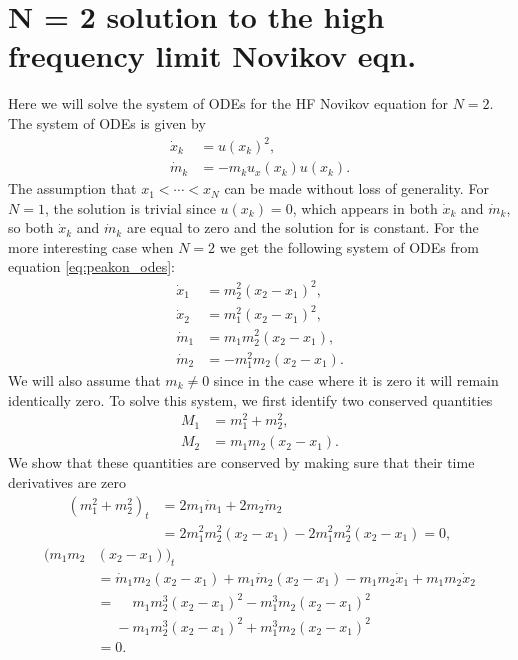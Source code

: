 \documentclass[english,master]{liumaiex}
\theoremstyle{plain}
\theoremstyle{definition}
\begin{document}
\section{N = 2 solution to the high frequency limit Novikov eqn.}
Here we will solve the system of ODEs for the HF Novikov equation for $N = 2$. The system of ODEs is given by
\begin{equation}
\begin{aligned}
	\dot{x}_k &= u(x_k)^2, \\
	\dot{m}_k &= -m_k u_x(x_k)u(x_k).
\end{aligned}
\end{equation}
The assumption that $x_1 < \cdots < x_N$ can be made without loss of generality. For $N = 1$, the solution is trivial since $u(x_k) = 0$, which appears in both $\dot{x}_k$ and $\dot{m}_k$, so both $\dot{x}_k$ and $\dot{m}_k$ are equal to zero and the solution for is constant. For the more interesting case when $N = 2$ we get the following system of ODEs from equation \eqref{eq:peakon_odes}:
%
\begin{align}
	\dot{x}_1 & = m_2^2 (x_2 - x_1)^2, \\
	\dot{x}_2 & = m_1^2 (x_2 - x_1)^2, \\
	\dot{m}_1 & = m_1 m_2^2(x_2 - x_1),  \\
	\dot{m}_2 & = -m_1^2 m_2(x_2 - x_1).
\end{align}
%
We will also assume that $m_k \neq 0$ since in the case where it is zero it will remain identically zero.
%
To solve this system, we first identify two conserved quantities
\begin{align}
	M_1 &= m_1^2 + m_2^2, \\
	M_2 &= m_1m_2(x_2 - x_1).
\end{align}
%
We show that these quantities are conserved by making sure that their time derivatives are zero
\begin{equation}
\begin{aligned}
	(m_1^2 + m_2^2)_t 
	&= 2m_1\dot{m}_1 + 2m_2\dot{m}_2 \\
	&= 2m_1^2m_2^2(x_2 - x_1) - 2m_1^2m_2^2(x_2 - x_1) = 0,
\end{aligned}
\end{equation}
\begin{equation}
\begin{aligned}
	(m_1m_2&(x_2 - x_1))_t \\
	&= \dot{m}_1m_2(x_2 - x_1) + m_1\dot{m}_2(x_2 - x_1)
	- m_1m_2\dot{x}_1 + m_1m_2\dot{x}_2 \\
	&=\phantom{-} m_1m_2^3(x_2 - x_1)^2 - m_1^3m_2(x_2 - x_1)^2 \\
	&\phantom{=}- m_1m_2^3(x_2 - x_1)^2 + m_1^3m_2(x_2 - x_1)^2 \\
	&=0. \\
\end{aligned}
\end{equation}
\end{document}
